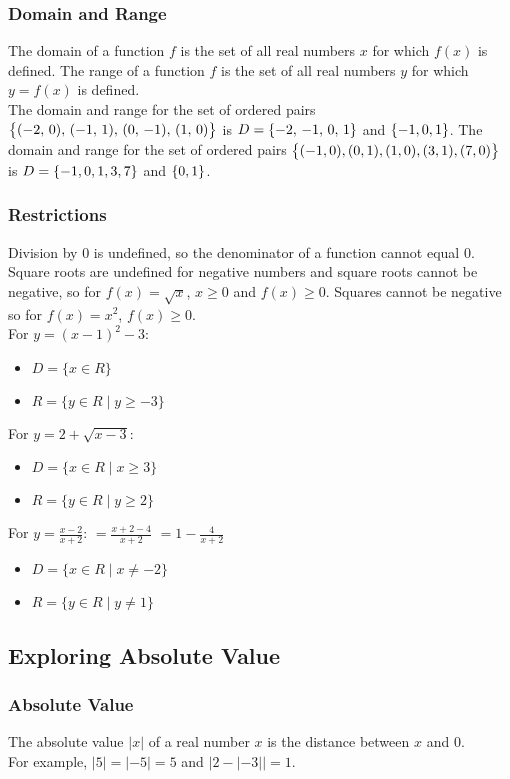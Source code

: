 \documentclass{article}
\begin{document}
	\subsubsection{Domain and Range}
	The domain of a function $f$ is the set of all real numbers $x$ for which $f(x)$ is defined. The range of a function $f$ is the set of all real numbers $y$ for which $y=f(x)$  is defined.\\
	The domain and range for the set of ordered pairs $\set{(-2,\,0),\,(-1,\,1),\,(0,\,-1),\,(1,\,0)}$ is $D=\set{-2,\,-1,\,0,\,1}$ and $\set{-1, 0, 1}$. The domain and range for the set of ordered pairs $\set{(-1, 0), (0, 1), (1, 0), (3, 1), (7, 0)}$ is $D=\set{-1, 0, 1, 3, 7}$ and $\set{0, 1}$.
	\subsubsection{Restrictions}
	Division by 0 is undefined, so the denominator of a function cannot equal 0. Square roots are undefined for negative numbers and square roots cannot be negative, so for $f(x)=\sqrt{x}$, $x\geq0$ and $f(x)\geq0$. Squares cannot be negative so for $f(x)=x^2$, $f(x)\geq0$.\\
	For $y=(x-1)^2-3$:
	\begin{itemize}
		\item $D=\{x\in R\}$
		\item $R=\{y\in R\mid y\geq-3\}$
	\end{itemize}
	For $y=2+\sqrt{x-3}$:
	\begin{itemize}
		\item $D=\{x\in R\mid x\geq3\}$
		\item $R=\{y\in R\mid y\geq2\}$
	\end{itemize}
	For $y=\frac{x-2}{x+2}$: $=\frac{x+2-4}{x+2}$ $=1-\frac{4}{x+2}$
	\begin{itemize}
		\item $D=\{x\in R\mid x\neq-2\}$
		\item $R=\{y\in R\mid y\neq1\}$
	\end{itemize}
	\subsection{Exploring Absolute Value}
	\subsubsection{Absolute Value}
	The absolute value $|x|$ of a real number $x$ is the distance between $x$ and 0.\\
	For example, $|5|=|-5|=5$ and $\left|2-\left|-3\right|\right|=1$.
\end{document}
